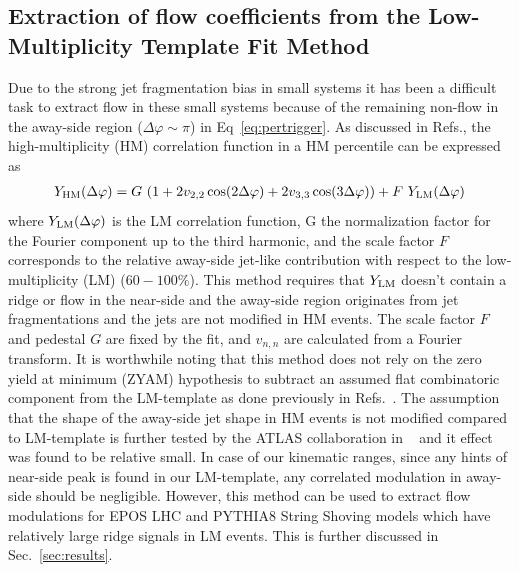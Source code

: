 \subsection{Extraction of flow coefficients from the Low-Multiplicity Template Fit Method}

Due to the strong jet fragmentation bias in small systems it has been a difficult task to extract flow in these small systems because of the remaining non-flow in the away-side region ($\Delta\varphi \sim \pi$) in Eq~\ref{eq:pertrigger}. As discussed in Refs.\cite{ATLAS:2015hzw,ATLAS:2016yzd}, the high-multiplicity (HM) correlation function in a HM percentile can be expressed as 
\begin{eqnarray}
Y_{\rm{HM}}(\Delta\varphi) = G~(1 + 2v_{2,2}\cos(2\Delta\varphi) + 2v_{3,3}\cos(3\Delta\varphi)) + F~Y_{\rm{LM}}(\Delta\varphi)
\end{eqnarray}
where $Y_{\rm{LM}}(\Delta\varphi)$ is the LM correlation function, G the normalization factor for the Fourier component up to the third harmonic, and the scale factor $F$ corresponds to the relative away-side jet-like contribution with respect to the low-multiplicity (LM) ($60-100\%$). This method requires that $Y_{\rm{LM}}$ doesn't contain a ridge or flow in the near-side and the away-side region originates from jet fragmentations and the jets are not modified in HM events. The scale factor $F$ and pedestal $G$ are fixed by the fit, and $v_{n,n}$ are calculated from a Fourier transform. It is worthwhile noting that this method does not rely on the zero yield at minimum (ZYAM) hypothesis to subtract an assumed flat combinatoric component from the LM-template as done previously in Refs.~\cite{ATLAS:2012cix,ATLAS:2014qaj}. The assumption that the shape of the away-side jet shape in HM events is not modified compared to LM-template is further tested by the ATLAS collaboration in ~\cite{ATLAS:2018ngv} and it effect was found to be relative small. In case of our kinematic ranges, since any hints of near-side peak is found in our LM-template, any correlated modulation in away-side should be negligible. However, this method can be used to extract flow modulations for EPOS LHC and PYTHIA8 String Shoving models which have relatively large ridge signals in LM events. This is further discussed in Sec.~\ref{sec:results}.

